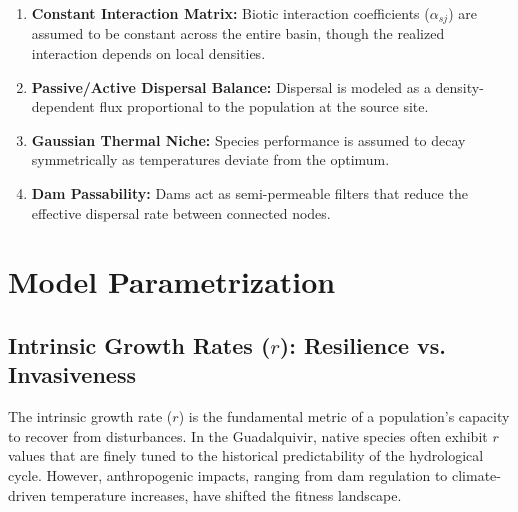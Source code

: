 \documentclass[11pt,a4paper]{article}
\begin{document}
{\begin{enumerate}
\def\labelenumi{\arabic{enumi}.}
\tightlist
\item
  \textbf{Constant Interaction Matrix:} Biotic interaction coefficients
  (\(\alpha_{sj}\)) are assumed to be constant across the entire basin,
  though the realized interaction depends on local densities.
\item
  \textbf{Passive/Active Dispersal Balance:} Dispersal is modeled as a
  density-dependent flux proportional to the population at the source
  site.
\item
  \textbf{Gaussian Thermal Niche:} Species performance is assumed to
  decay symmetrically as temperatures deviate from the optimum.
\item
  \textbf{Dam Passability:} Dams act as semi-permeable filters that
  reduce the effective dispersal rate between connected nodes.
\end{enumerate}

\section{Model Parametrization}

\subsection{Intrinsic Growth Rates ($r$): Resilience vs. Invasiveness}
The intrinsic growth rate ($r$) is the fundamental metric of a population's capacity to recover from disturbances. In the Guadalquivir, native species often exhibit $r$ values that are finely tuned to the historical predictability of the hydrological cycle. However, anthropogenic impacts, ranging from dam regulation to climate-driven temperature increases, have shifted the fitness landscape.


}
\end{document}
